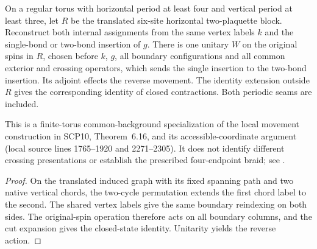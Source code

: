 \begin{lemma}
    \label{thm:peps_gauged_horizontal_flux_move}
    \leanok
    On a regular torus with horizontal period at least four and vertical period
    at least three, let $R$ be the translated six-site horizontal two-plaquette
    block. Reconstruct both internal assignments from the same vertex labels
    $k$ and the single-bond or two-bond insertion of $g$. There is one unitary
    $W$ on the original spins in $R$, chosen before $k$, $g$, all boundary
    configurations and all common exterior and crossing operators, which sends
    the single insertion to the two-bond insertion. Its adjoint effects the
    reverse movement. The identity extension outside $R$ gives the corresponding
    identity of closed contractions. Both periodic seams are included.

    This is a finite-torus common-background specialization of the local movement
    construction in SCP10, Theorem~6.16, and its accessible-coordinate argument
    (local source lines 1765--1920 and 2271--2305). It does not identify different
    crossing presentations or establish the prescribed four-endpoint braid;
    see \cite{gap:rmp_peps_quantum_double_g_isometry}.
\end{lemma}
\begin{proof}\leanok
    On the translated induced graph with its fixed spanning path and two
    native vertical chords, the two-cycle permutation extends the first chord
    label to the second. The shared vertex labels give the same boundary
    reindexing on both sides. The original-spin operation therefore acts on all
    boundary columns, and the cut expansion gives the closed-state
    identity. Unitarity yields the reverse action.
\end{proof}

